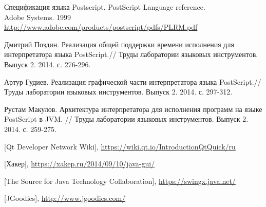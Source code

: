 \documentclass[14pt]{extarticle}
\begin{document}
	
	\pagebreak

	
	\begin{thebibliography}{}
		
		Спецификация языка Postscript. PostScript Language reference. \\
		Adobe Systems. 1999\\
		\url{http://www.adobe.com/products/postscript/pdfs/PLRM.pdf}

		Дмитрий Поздин. Реализация общей поддержки времени исполнения для интерпретатора языка PostScript.// Труды лаборатории языковых инструментов. Выпуск 2. 2014. с. 276-296.
		
		Артур Гудиев.
		Реализация графической части интерпретатора языка PostScript.// Труды лаборатории языковых инструментов. Выпуск 2. 2014. с. 297-312.

		Рустам Макулов.
		Архитектура интерпретатора для исполнения программ на языке PostScript в JVM. // Труды лаборатории языковых инструментов. Выпуск 2. 2014. с. 259-275.
				
		[Qt Developer Network Wiki], 
		\url{https://wiki.qt.io/IntroductionQtQuick/ru}
		
		[Хакер], \url{https://xakep.ru/2014/09/10/java-gui/}
		
		
		[The Source for Java Technology Collaboration], \url{https://swingx.java.net/}
		
		
		[JGoodies], \url{http://www.jgoodies.com/}
		
	\end{thebibliography}
\end{document}
